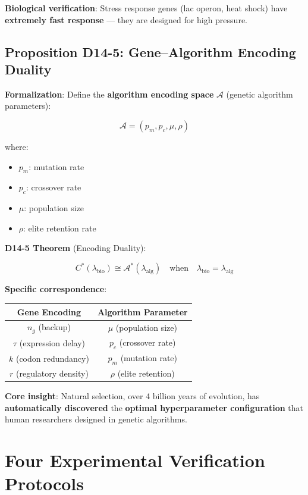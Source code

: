 \documentclass[12pt,a4paper]{article}
\newcommand{\calA}{\mathcal{A}}
\newcommand{\calCstar}{C^*}
\newcommand{\calAstar}{\mathcal{A}^*}
\newcommand{\nbg}{n_g}
\newcommand{\lambio}{\lambda_{\text{bio}}}
\newcommand{\lamalg}{\lambda_{\text{alg}}}
\begin{document}
\textbf{Biological verification}: Stress response genes (lac operon, heat shock) have \textbf{extremely fast response} --- they are designed for high pressure.

\subsection{Proposition D14-5: Gene--Algorithm Encoding Duality}

\textbf{Formalization}: Define the \textbf{algorithm encoding space} $\calA$ (genetic algorithm parameters):

$$\calA = (p_m, p_c, \mu, \rho)$$

where:
\begin{itemize}
    \item $p_m$: mutation rate
    \item $p_c$: crossover rate
    \item $\mu$: population size
    \item $\rho$: elite retention rate
\end{itemize}

\textbf{D14-5 Theorem} (Encoding Duality):

$$\calCstar(\lambio) \cong \calAstar(\lamalg) \quad \text{when} \quad \lambio = \lamalg$$

\textbf{Specific correspondence}:

\begin{center}
\begin{tabular}{c c}
\toprule
\textbf{Gene Encoding} & \textbf{Algorithm Parameter} \\
\midrule
$\nbg$ (backup) & $\mu$ (population size) \\
$\tau$ (expression delay) & $p_c$ (crossover rate) \\
$k$ (codon redundancy) & $p_m$ (mutation rate) \\
$r$ (regulatory density) & $\rho$ (elite retention) \\
\bottomrule
\end{tabular}
\end{center}

\textbf{Core insight}: Natural selection, over 4 billion years of evolution, has \textbf{automatically discovered} the \textbf{optimal hyperparameter configuration} that human researchers designed in genetic algorithms.

\section{Four Experimental Verification Protocols}
\end{document}
